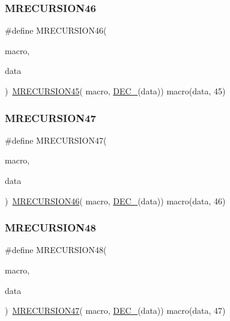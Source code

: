 \subsubsection{\texorpdfstring{MRECURSION46}{MRECURSION46}}
{\footnotesize\ttfamily \#define M\+R\+E\+C\+U\+R\+S\+I\+O\+N46(\begin{DoxyParamCaption}\item[{}]{macro,  }\item[{}]{data }\end{DoxyParamCaption})~\mbox{\hyperlink{group__group__sam0__utils__mrecursion_ga6c44b77fa83c21cc22ccaf63ccf61ce9}{M\+R\+E\+C\+U\+R\+S\+I\+O\+N45}}(  macro, \mbox{\hyperlink{group__group__sam0__utils__mrecursion_ga1d23d683797679dca8c3512a54a5dcae}{D\+E\+C\+\_\+}}(data))   macro(data, 45)}

\mbox{\label{group__group__sam0__utils__mrecursion_ga5a7b09aafde0d0218dd81631ea9b8063}} 
\subsubsection{\texorpdfstring{MRECURSION47}{MRECURSION47}}
{\footnotesize\ttfamily \#define M\+R\+E\+C\+U\+R\+S\+I\+O\+N47(\begin{DoxyParamCaption}\item[{}]{macro,  }\item[{}]{data }\end{DoxyParamCaption})~\mbox{\hyperlink{group__group__sam0__utils__mrecursion_ga15da6fe5b481385cb81447562e307e67}{M\+R\+E\+C\+U\+R\+S\+I\+O\+N46}}(  macro, \mbox{\hyperlink{group__group__sam0__utils__mrecursion_ga1d23d683797679dca8c3512a54a5dcae}{D\+E\+C\+\_\+}}(data))   macro(data, 46)}

\mbox{\label{group__group__sam0__utils__mrecursion_gaf338c8087c63ca31cb23b9502cf53a81}} 
\subsubsection{\texorpdfstring{MRECURSION48}{MRECURSION48}}
{\footnotesize\ttfamily \#define M\+R\+E\+C\+U\+R\+S\+I\+O\+N48(\begin{DoxyParamCaption}\item[{}]{macro,  }\item[{}]{data }\end{DoxyParamCaption})~\mbox{\hyperlink{group__group__sam0__utils__mrecursion_ga5a7b09aafde0d0218dd81631ea9b8063}{M\+R\+E\+C\+U\+R\+S\+I\+O\+N47}}(  macro, \mbox{\hyperlink{group__group__sam0__utils__mrecursion_ga1d23d683797679dca8c3512a54a5dcae}{D\+E\+C\+\_\+}}(data))   macro(data, 47)}

